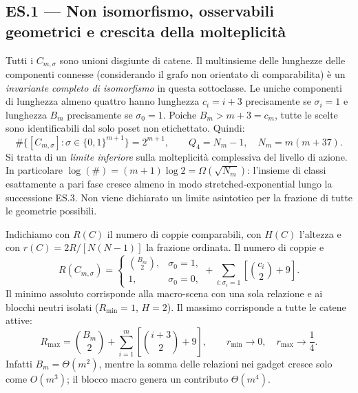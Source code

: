 \documentclass[11pt,a4paper]{article}
\begin{document}
\clearpage
\subsection*{ES.1 --- Non isomorfismo, osservabili geometrici e crescita della molteplicit\`a}
Tutti i $C_{m,\sigma}$ sono unioni disgiunte di catene. Il multinsieme delle lunghezze delle componenti connesse (considerando il grafo non orientato di comparabilita) \`e un \emph{invariante completo di isomorfismo} in questa sottoclasse. Le uniche componenti di lunghezza almeno quattro hanno lunghezza $c_i=i+3$ precisamente se $\sigma_i=1$ e lunghezza $B_m$ precisamente se $\sigma_0=1$. Poiche $B_m>m+3=c_m$, tutte le scelte sono identificabili dal solo poset non etichettato. Quindi:
\begin{equation}
 \boxed{\#\{[C_{m,\sigma}]:\sigma\in\{0,1\}^{m+1}\}=2^{m+1},
 \qquad Q_4=N_m-1,\quad N_m=m(m+37).}\tag{ES.8}
\end{equation}
Si tratta di un \emph{limite inferiore} sulla molteplicit\`a complessiva del livello di azione. In particolare $\log(\#)=(m+1)\log2=\Omega(\sqrt{N_m})$: l'insieme di classi esattamente a pari fase cresce almeno in modo stretched-exponential lungo la successione ES.3. Non viene dichiarato un limite asintotico per la frazione di tutte le geometrie possibili.

Indichiamo con $R(C)$ il numero di coppie comparabili, con $H(C)$ l'altezza e con $r(C)=2R/[N(N-1)]$ la frazione ordinata. Il numero di coppie e
\begin{equation}
 R(C_{m,\sigma})=
 \begin{cases}\binom{B_m}{2},&\sigma_0=1,\\1,&\sigma_0=0,\end{cases}
 +\sum_{i:\sigma_i=1}\left[\binom{c_i}{2}+9\right].\tag{ES.9}
\end{equation}
Il minimo assoluto corrisponde alla macro-scena con una sola relazione e ai blocchi neutri isolati ($R_{\min}=1$, $H=2$). Il massimo corrisponde a tutte le catene attive:
\begin{equation}
 R_{\max}=\binom{B_m}{2}+\sum_{i=1}^m\left[\binom{i+3}{2}+9\right],\qquad
 r_{\min}\longrightarrow0,\quad r_{\max}\longrightarrow\frac14.
 \tag{ES.10}
\end{equation}
Infatti $B_m=\Theta(m^2)$, mentre la somma delle relazioni nei gadget cresce solo come $O(m^3)$; il blocco macro genera un contributo $\Theta(m^4)$.
\end{document}
